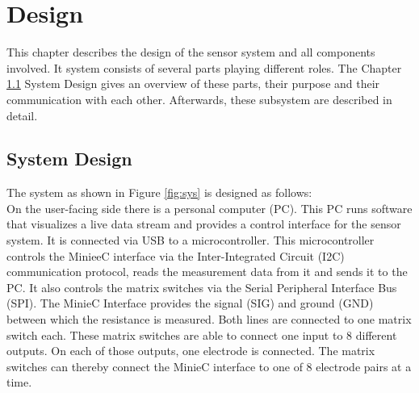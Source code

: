 \chapter{Design}

This chapter describes the design of the sensor system and all components involved. It system consists of several parts playing different roles. The Chapter \ref{sd} System Design gives an overview of these parts, their purpose and their communication with each other. Afterwards, these subsystem are described in detail.\\

\section{System Design} \label{sd}

The system as shown in Figure \ref{fig:sys} is designed as follows:\\
On the user-facing side there is a personal computer (PC). This PC runs software that visualizes a live data stream and provides a control interface for the sensor system. It is connected via USB to a microcontroller. This microcontroller controls the MinieeC interface via the Inter-Integrated Circuit (I2C) communication protocol, reads the measurement data from it and sends it to the PC. It also controls the matrix switches via the Serial Peripheral Interface Bus (SPI). The MinieC Interface provides the signal (SIG) and ground (GND) between which the resistance is measured. Both lines are connected to one matrix switch each. These matrix switches are able to connect one input to 8 different outputs. On each of those outputs, one electrode is connected. The matrix switches can thereby connect the MinieC interface to one of 8 electrode pairs at a time.

